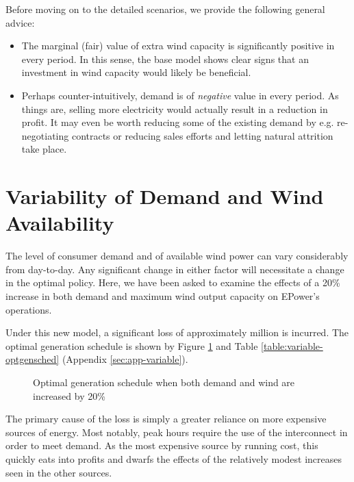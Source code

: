 \documentclass[twocolumn]{article}
\begin{document}
    Before moving on to the detailed scenarios, we provide the following general advice:
    \begin{itemize}
    
    	\item The marginal (fair) value of extra wind capacity is significantly positive in every period.  In this sense, the base model shows clear signs that an investment in wind capacity would likely be beneficial.
        
        \item Perhaps counter-intuitively, demand is of \textit{negative} value in every period.  As things are, selling more electricity would actually result in a reduction in profit.  It may even be worth reducing some of the existing demand by e.g. re-negotiating contracts or reducing sales efforts and letting natural attrition take place.
    
    \end{itemize}
    
    
    
    
    \section{Variability of Demand and Wind Availability}
    
    The level of consumer demand and of available wind power can vary considerably from day-to-day.  Any significant change in either factor will necessitate a change in the optimal policy.  Here, we have been asked to examine the effects of a 20\% increase in both demand and maximum wind output capacity on EPower's operations.
    
    Under this new model, a significant loss of approximately  million is incurred.  The optimal generation schedule is shown by Figure \ref{fig:variable-optgensched} and Table \ref{table:variable-optgensched} (Appendix \ref{sec:app-variable}).
    
    \begin{figure}[ht!]
        \centering
        \caption{Optimal generation schedule when both demand and wind are increased by 20\% \label{fig:variable-optgensched}}
    \end{figure}
    
   The primary cause of the loss is simply a greater reliance on more expensive sources of energy.  Most notably, peak hours require the use of the interconnect in order to meet demand.  As the most expensive source by running cost, this quickly eats into profits and dwarfs the effects of the relatively modest increases seen in the other sources.
    
\end{document}
